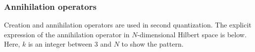 \documentclass{beamer}
\begin{document}
\begin{frame}
  \frametitle{Annihilation operators}
  Creation and annihilation operators are used in second quantization.
  The explicit expression of the annihilation operator in $N$-dimensional Hilbert space is below.
  Here, $k$ is an integer between 3 and $N$ to show the pattern.

  \begin{center}
  \end{center}
\end{frame}
\end{document}
